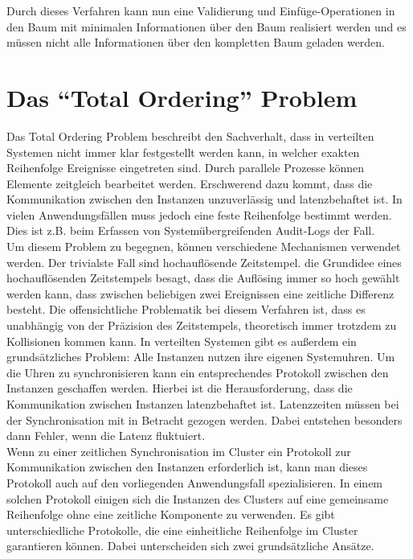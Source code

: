 Durch dieses Verfahren kann nun eine Validierung und Einfüge-Operationen in den Baum mit minimalen Informationen über den Baum realisiert werden und es müssen nicht alle Informationen über den kompletten Baum geladen werden. 

\section{Das "`Total Ordering"' Problem}
Das Total Ordering Problem beschreibt den Sachverhalt, dass in verteilten Systemen nicht immer klar festgestellt werden kann, in welcher exakten Reihenfolge Ereignisse eingetreten sind. Durch parallele Prozesse können Elemente zeitgleich bearbeitet werden. Erschwerend dazu kommt, dass die Kommunikation zwischen den Instanzen unzuverlässig und latenzbehaftet ist. In vielen Anwendungsfällen muss jedoch eine feste Reihenfolge bestimmt werden. Dies ist z.B. beim Erfassen von Systemübergreifenden Audit-Logs der Fall.\cite{359563}\\
Um diesem Problem zu begegnen, können verschiedene Mechanismen verwendet werden. Der trivialste Fall sind hochauflösende Zeitstempel. die Grundidee eines hochauflösenden Zeitstempels besagt, dass die Auflösing immer so hoch gewählt werden kann, dass zwischen beliebigen zwei Ereignissen eine zeitliche Differenz besteht. Die offensichtliche Problematik bei diesem Verfahren ist, dass es unabhängig von der Präzision des Zeitstempels, theoretisch immer trotzdem zu Kollisionen kommen kann. In verteilten Systemen gibt es außerdem ein grundsätzliches Problem: Alle Instanzen nutzen ihre eigenen Systemuhren. Um die Uhren zu synchronisieren kann ein entsprechendes Protokoll zwischen den Instanzen geschaffen werden. Hierbei ist die Herausforderung, dass die Kommunikation zwischen Instanzen latenzbehaftet ist. Latenzzeiten müssen bei der Synchronisation mit in Betracht gezogen werden. Dabei entstehen besonders dann Fehler, wenn die Latenz fluktuiert.\cite{315340}\\
Wenn zu einer zeitlichen Synchronisation im Cluster ein Protokoll zur Kommunikation zwischen den Instanzen erforderlich ist, kann man dieses Protokoll auch auf den vorliegenden Anwendungsfall spezialisieren. In einem solchen Protokoll einigen sich die Instanzen des Clusters auf eine gemeinsame Reihenfolge ohne eine zeitliche Komponente zu verwenden. Es gibt unterschiedliche Protokolle, die eine einheitliche Reihenfolge im Cluster garantieren können. Dabei unterscheiden sich zwei grundsätzliche Ansätze.\\
